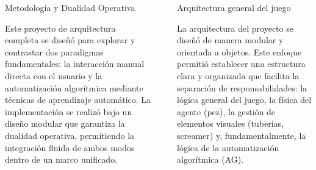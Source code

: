 \documentclass[final]{beamer}
\newlength{\sepwidth}
\newlength{\colwidth}
\newcommand{\separatorcolumn}{\begin{column}{\sepwidth}\end{column}}
\begin{document}
\begin{frame}[t]
\begin{columns}[t]
\begin{column}{\colwidth}
  \begin{block}{Metodología y Dualidad Operativa}

    Este proyecto de arquitectura completa se diseñó para explorar y contrastar dos paradigmas fundamentales: la interacción manual directa con el usuario y la automatización algorítmica mediante técnicas de aprendizaje automático. La implementación se realizó
    bajo un diseño modular que garantiza la dualidad operativa, permitiendo la integración
    fluida de ambos modos dentro de un marco unificado.

%
%
%
%
%
%
%
  \end{block}

\end{column}

\separatorcolumn

\begin{column}{\colwidth}

  \begin{block}{Arquitectura general del juego}

    La arquitectura del proyecto se diseñó de manera modular y orientada a objetos. Este
    enfoque permitió establecer una estructura clara y organizada que facilita la separación
    de responsabilidades: la lógica general del juego, la física del agente (pez), la gestión de
    elementos visuales (tuberías, screamer) y, fundamentalmente, la lógica de la automatización algorítmica (AG).


\end{block}
\end{column}
\end{columns}
\end{frame}
\end{document}
